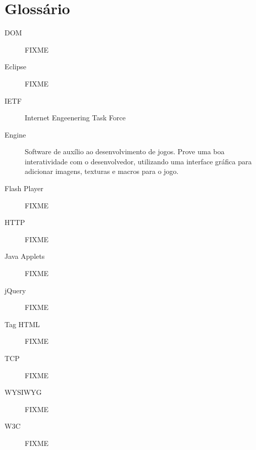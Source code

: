 
\section*{Glossário}

\begin{description}
\item[DOM ] FIXME
\item[Eclipse ] FIXME
\item[IETF ] Internet Engeenering Task Force
\item[Engine ] Software de auxílio ao desenvolvimento de jogos. Prove
uma boa interatividade com o desenvolvedor, utilizando uma interface
gráfica para adicionar imagens, texturas e macros para o jogo.
\item[Flash Player ] FIXME
\item[HTTP ] FIXME
\item[Java Applets ] FIXME
\item[jQuery ] FIXME
\item[Tag HTML ] FIXME
\item[TCP ] FIXME
\item[WYSIWYG ] FIXME
\item[W3C ] FIXME

\end{description}

\newpage

